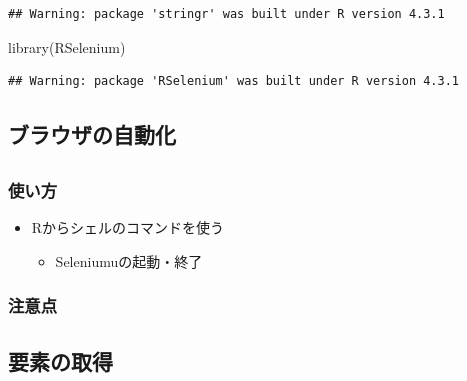 \documentclass[
]{article}
\newenvironment{Shaded}{\begin{snugshade}}{\end{snugshade}}
\newcommand{\FunctionTok}[1]{\textcolor[rgb]{0.00,0.00,0.00}{#1}}
\newcommand{\NormalTok}[1]{#1}
\providecommand{\tightlist}{%
  \setlength{\itemsep}{0pt}\setlength{\parskip}{0pt}}
\begin{document}
\begin{verbatim}
## Warning: package 'stringr' was built under R version 4.3.1
\end{verbatim}

\begin{Shaded}
\begin{Highlighting}[]
\FunctionTok{library}\NormalTok{(RSelenium)}
\end{Highlighting}
\end{Shaded}

\begin{verbatim}
## Warning: package 'RSelenium' was built under R version 4.3.1
\end{verbatim}

\hypertarget{ux30d6ux30e9ux30a6ux30b6ux306eux81eaux52d5ux5316}{%
\subsection{ブラウザの自動化}\label{ux30d6ux30e9ux30a6ux30b6ux306eux81eaux52d5ux5316}}

\hypertarget{section}{%
\subsection{}\label{section}}

\hypertarget{ux4f7fux3044ux65b9}{%
\subsubsection{使い方}\label{ux4f7fux3044ux65b9}}

\begin{itemize}
\tightlist
\item
  Rからシェルのコマンドを使う

  \begin{itemize}
  \tightlist
  \item
    Seleniumuの起動・終了
  \end{itemize}
\end{itemize}

\hypertarget{ux6ce8ux610fux70b9}{%
\subsubsection{注意点}\label{ux6ce8ux610fux70b9}}

\hypertarget{ux8981ux7d20ux306eux53d6ux5f97}{%
\subsection{要素の取得}\label{ux8981ux7d20ux306eux53d6ux5f97}}
\end{document}
